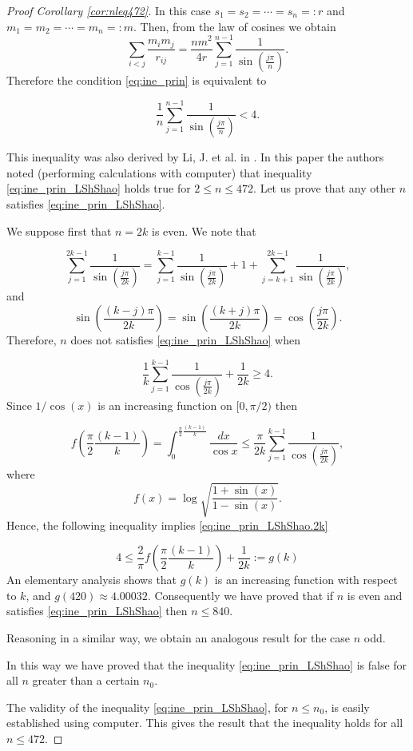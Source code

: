 \documentclass[twoside]{article}
\theoremstyle{remark}
\begin{document}
\begin{proof}[Proof Corollary \ref{cor:nleq472}]
In this case $s_1=s_2=\cdots=s_n=:r$ and $m_1=m_2=\cdots=m_n=:m$. Then, from the law of cosines we obtain
\[
 \sum_{i<j}\frac{m_im_j}{r_{ij}}=\frac{nm^2}{4r}\sum_{j=1}^{n-1}\frac{1}{\sin\left(\frac{j\pi}{n}\right)}.
\]
Therefore the condition \eqref{eq:ine_prin} is equivalent to

\begin{equation}\label{eq:ine_prin_LShShao}
  \frac1n\sum_{j=1}^{n-1}\frac{1}{\sin\left(\frac{j\pi}{n}\right)}<4.
\end{equation}

This inequality was also derived by Li, J. et al. in \cite{li2013characterization}. In this paper the authors noted (performing calculations with computer) that inequality \eqref{eq:ine_prin_LShShao} holds true for $2\leq n\leq 472$. Let us prove that any other $n$ satisfies \eqref{eq:ine_prin_LShShao}.

We suppose first that $n=2k$ is even. We note that

$$ \sum_{j=1}^{2k-1}\frac{1}{\sin\left(\frac{j\pi}{2k}\right)}= \sum_{j=1}^{k-1}\frac{1}{\sin\left(\frac{j\pi}{2k}\right)}+1 +\sum_{j=k+1}^{2k-1}\frac{1}{\sin\left(\frac{j\pi}{2k}\right)},$$
and
$$ \sin\left(\frac{(k-j)\pi}{2k}\right)=\sin\left(\frac{(k+j)\pi}{2k}\right)=\cos\left(\frac{j\pi}{2k}\right).$$
Therefore, $n$ does not satisfies \eqref{eq:ine_prin_LShShao} when

\begin{equation}\label{eq:ine_prin_LShShao.2k}
 \frac{1}{k}\sum_{j=1}^{k-1}\frac{1}{\cos\left(\frac{j\pi}{2k}\right)}+\frac{1}{2k}\geq 4.
\end{equation}
Since $1/\cos(x)$ is an increasing function on $[0,\pi/2)$ then

$$ f\left(\frac{\pi}{2 }\frac{(k-1)}{k}  \right)=
\int_0^{\frac{\pi}{2 }\frac{(k-1)}{k} }\frac{dx}{\cos x}
\leq \frac{\pi}{2k}\sum_{j=1}^{k-1}\frac{1}{\cos\left(\frac{j\pi}{2k}\right)}, $$
where
$$f(x)=\log\sqrt{\frac{1+\sin(x)}{1-\sin(x)}}.$$
Hence, the following inequality implies \eqref{eq:ine_prin_LShShao.2k}

$$4\leq \frac{2}{\pi}f\left(\frac{\pi}{2 }\frac{(k-1)}{k}  \right) +\frac{1}{2k}:=g(k)$$
An elementary analysis shows that $g(k)$ is an increasing function with respect to $k$, and $g(420)\approx 4.00032$. Consequently we have proved that if $n$ is even and satisfies \eqref{eq:ine_prin_LShShao} then $n\leq 840$.

Reasoning in a similar way, we obtain an analogous result for the case $n$ odd.

In this way we have proved that the inequality \eqref{eq:ine_prin_LShShao} is false for all $n$ greater than a certain $n_0$.

The validity of the inequality \eqref{eq:ine_prin_LShShao}, for $n\leq n_0$, is easily established using computer. This gives the result that the inequality holds for all $n \leq 472$.
\end{proof}
\end{document}
